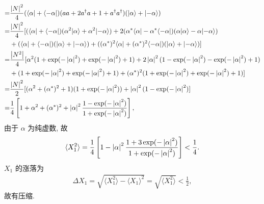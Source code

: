 \documentclass{assignment}
\begin{document}
\begin{sol}
\begin{itemize}
\begin{align}
            \notag=&\frac{\left\lvert N\right\rvert^2}{4}(\langle\alpha\rvert+\langle-\alpha\rvert)(aa+2a^{\dagger}a+1+a^{\dagger}a^{\dagger})(\lvert\alpha\rangle+\lvert-\alpha\rangle)\\
            \notag=&\frac{\left\lvert N\right\rvert^2}{4}[(\langle\alpha\rvert+\langle-\alpha\rvert)(\alpha^2\lvert\alpha\rangle+\alpha^2\lvert-\alpha\rangle)+2(\alpha^*\langle\alpha\rvert-\alpha^*\langle-\alpha\rvert)(\alpha\lvert\alpha\rangle-\alpha\lvert-\alpha\rangle)\\
            \notag&+(\langle\alpha\rvert+\langle-\alpha\rvert)(\lvert\alpha\rangle+\lvert-\alpha\rangle)+((\alpha^*)^2\langle\alpha\rvert+(\alpha^*)^2\langle-\alpha\rvert)(\lvert\alpha\rangle+\lvert-\alpha\rangle)]\\
            \notag=&\frac{\left\lvert N^2\right\rvert}{4}[\alpha^2(1+\exp(-\left\lvert\alpha\right\rvert^2)+\exp(-\left\lvert\alpha\right\rvert^2)+1)+2\left\lvert\alpha\right\rvert^2(1-\exp(-\left\lvert\alpha\right\rvert^2)-\exp(-\left\lvert\alpha\right\rvert^2)+1)\\
            \notag&+(1+\exp(-\left\lvert\alpha\right\rvert^2)+\exp(-\left\lvert\alpha\right\rvert^2)+1)+(\alpha^*)^2(1+\exp(-\left\lvert\alpha\right\rvert^2)+\exp(-\left\lvert\alpha\right\rvert^2)+1)]\\
            \notag=&\frac{\left\lvert N\right\rvert^2}{2}[(\alpha^2+(\alpha^*)^2+1)(1+\exp(-\left\lvert\alpha\right\rvert^2))+\left\lvert\alpha\right\rvert^2(1-\exp(-\left\lvert\alpha\right\rvert^2)]\\
            =&\frac{1}{4}\left[1+\alpha^2+(\alpha^*)^2+\left\lvert\alpha\right\rvert^2\frac{1-\exp(-\left\lvert\alpha\right\rvert^2)}{1+\exp(-\left\lvert\alpha\right\rvert^2)}\right],
        \end{align}
        由于 $\alpha$ 为纯虚数, 故
        \begin{align}
            \langle X_1^2\rangle=\frac{1}{4}\left[1-\left\lvert\alpha\right\rvert^2\frac{1+3\exp(-\left\lvert\alpha\right\rvert^2)}{1+\exp(-\left\lvert\alpha\right\rvert^2)}\right]<\frac{1}{4}.
        \end{align}
        $X_1$ 的涨落为
        \begin{align}
            \Delta X_1=\sqrt{\langle X_1^2\rangle-\langle X_1\rangle^2}=\sqrt{\langle X_1^2\rangle}<\frac{1}{2},
        \end{align}
        故有压缩.
    \end{itemize}
\end{sol}
\end{document}
